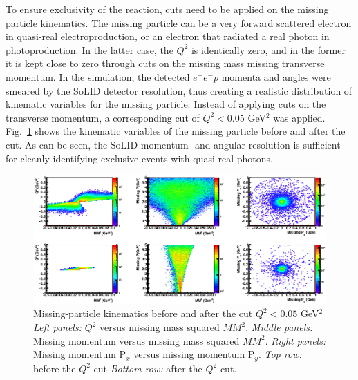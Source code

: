 To ensure exclusivity of the reaction, cuts need to be applied on the missing
particle kinematics. The missing particle can be a very forward scattered
electron in quasi-real electroproduction, or an electron that radiated a real
photon in photoproduction. In the latter case, the $Q^2$ is identically zero,
and in the former it is kept close to zero through cuts on the missing mass
missing transverse momentum.
In the simulation, the detected $e^+e^-p$ momenta and angles were smeared by
the SoLID detector resolution, thus creating a realistic distribution of
kinematic variables for the missing particle. Instead of applying cuts on the
transverse momentum, a corresponding cut of $Q^2 < 0.05$ GeV$^2$ was applied.
Fig.~\ref{fig:Miss_2D} shows the kinematic variables of the missing particle
before and after the cut. As can be seen, the SoLID momentum- and angular
resolution is sufficient for cleanly identifying exclusive events with
quasi-real photons.

\begin{figure}[t]
\includegraphics[scale=0.9]{Miss_2D.eps}
\caption{\small{Missing-particle kinematics before and after the cut
$Q^2 < 0.05$ GeV$^2$
{\it Left panels:} $Q^2$ versus missing mass squared $MM^2$.
{\it Middle panels:} Missing momentum versus missing mass squared $MM^2$.
{\it Right panels:} Missing momentum P$_x$ versus missing momentum P$_y$.
{\it Top row:} before the $Q^2$ cut
{\it Bottom row:} after the $Q^2$ cut.}}
\label{fig:Miss_2D}
\end{figure}
